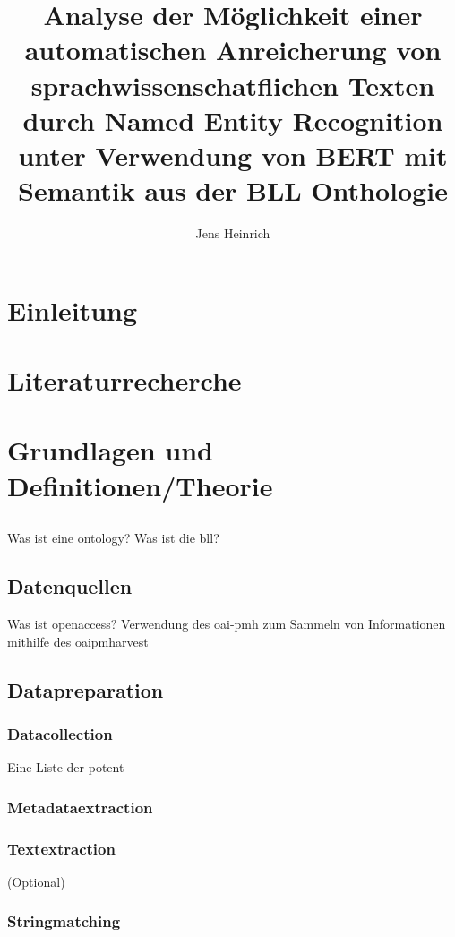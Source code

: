 \documentclass[
german,
]{bachelor}
\author{Jens Heinrich}
\title{%
Analyse der Möglichkeit
einer automatischen Anreicherung von sprachwissenschatflichen Texten
durch Named Entity Recognition
unter Verwendung von BERT
mit Semantik aus der BLL Onthologie%
}
\begin{document}
\maketitle

\tableofcontents
\cleardoublepage

\section{Einleitung}

\section{Literaturrecherche}

\section{Grundlagen und Definitionen/Theorie}
\subsection{}
Was ist eine \gls{ontology}?
Was ist die \gls{bll}?

\subsection{Datenquellen}
Was ist \gls{openaccess}?
Verwendung des \gls{oai-pmh} zum Sammeln von Informationen
mithilfe des \gls{oaipmharvest}



\subsection{Datapreparation}
\subsubsection{Datacollection}
Eine Liste der potent
\subsubsection{Metadataextraction}
\subsubsection{Textextraction} (Optional)
\subsubsection{Stringmatching}
\end{document}
